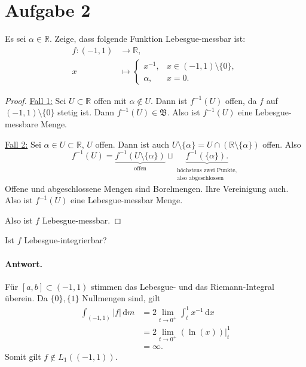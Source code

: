 \documentclass[10pt]{article}\usepackage[]{graphicx}\usepackage[]{color}
\newcommand{\R}{\mathbb{R}}
\newcommand{\df}{\,\textrm{d}}
\begin{document}
\section*{Aufgabe 2}
Es sei $\alpha \in \R$.
Zeige, dass folgende Funktion Lebesgue-messbar ist:
\begin{align*}
  f:    (-1, 1)   &\to        \R,\\
        x         &\mapsto
        \begin{cases}
          x^{-1},  & x \in (-1,1)\setminus\{0\},\\
          \alpha,  & x = 0.
        \end{cases}
\end{align*}
\begin{proof}
  \uline{Fall 1:} Sei $U \subset \R$ offen mit $\alpha \notin U$.
  Dann ist $f^{-1}(U)$ offen, da $f$ auf $(-1,1) \setminus \{0\}$
  stetig ist.
  Dann $f^{-1}(U) \in \mathfrak{B}$.
  Also ist $f^{-1}(U)$ eine Lebesgue-messbare Menge.
  
  \uline{Fall 2:} Sei $\alpha \in U \subset \R$, $U$ offen.
  Dann ist auch $U \setminus \{\alpha\} = U \cap (\R\setminus\{\alpha\})$ offen.
  Also
  \[
    f^{-1}(U) = \underbrace{f^{-1}(U \setminus \{\alpha\})}_{\textrm{offen}} \sqcup \underbrace{f^{-1}(\{\alpha\}).}_{\substack{\textrm{höchstens zwei Punkte,}\\\textrm{also abgeschlossen}}}
  \]
  Offene und abgeschlossene Mengen sind Borelmengen. Ihre Vereinigung auch.
  Also ist $f^{-1}(U)$ eine Lebesgue-messbar Menge.
  
  Also ist $f$ Lebesgue-messbar.
\end{proof}

Ist $f$ Lebesgue-integrierbar?

\paragraph{Antwort.} Für $[a,b] \subset (-1,1)$ stimmen
das Lebesgue- und das Riemann-Integral überein.
Da $\{0\}, \{1\}$ Nullmengen sind, gilt
\begin{align*}
 \int_{(-1,1)} |f| \df m 
 &= 2 \lim_{t \to 0^+} \int_{t}^{1} x^{-1} \df x \\
 &= 2 \lim_{t \to 0^+} (\ln(x))|_t^{1} \\
 &= \infty.
\end{align*}
Somit gilt $f \notin L_1((-1,1))$.

\end{document}
